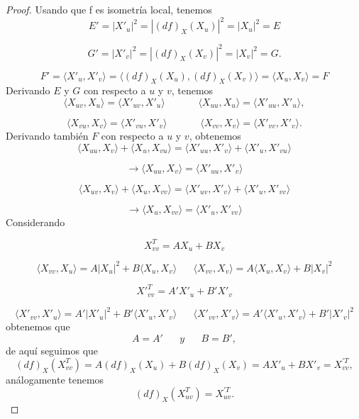 \begin{proof}
	Usando que f es isometría local, tenemos
	${ }$\\
	\[
		E' = |X'_u|^2 = |(df)_X(X_u)|^2 = |X_u|^2 = E
	\]
	
	\[
		G' = |X'_v|^2 = |(df)_X(X_v)|^2 = |X_v|^2 = G.
	\]
	
	\[
		F' = \langle X'_u, X'_v \rangle = \langle (df)_X(X_u), (df)_X(X_v) \rangle = \langle X_u, X_v \rangle = F
	\]
	${ }$\\
	
	Derivando $E$ y $G$ con respecto a $u$ y $v$, tenemos
	${ }$\\
	\[
		\langle X_{uv}, X_u \rangle = \langle X'_{uv}, X'_u \rangle \;\;\;\;\;\;  \;\;\;\;\;\; \langle X_{uu}, X_u \rangle = \langle X'_{uu}, X'_u \rangle,
	\]
	
	\[
		\langle X_{vu}, X_v \rangle = \langle X'_{vu}, X'_v \rangle \;\;\;\;\;\;  \;\;\;\;\;\; \langle X_{vv}, X_v \rangle = \langle X'_{vv}, X'_v \rangle.
	\]
	${ }$\\
	
	Derivando también $F$ con respecto a $u$ y $v$, obtenemos
	${ }$\\
	\[
		\langle X_{uu}, X_v \rangle + \langle X_u, X_{vu} \rangle = \langle X'_{uu}, X'_v \rangle + \langle X'_u, X'_{vu} \rangle
	\]
	
	\[
		\to \langle X_{uu}, X_v \rangle = \langle X'_{uu}, X'_v \rangle
	\]
	
	\[
		\langle X_{uv}, X_v \rangle + \langle X_u, X_{vv} \rangle = \langle X'_{uv}, X'_v \rangle + \langle X'_u, X'_{vv} \rangle
	\]
	
	\[
		\to \langle X_u, X_{vv} \rangle = \langle X'_u, X'_{vv} \rangle
	\]
	${ }$\\
	
	Considerando
	
	\[
		X^{T}_{vv} = AX_u + BX_v
	\]
	
	\[
		\langle X_{vv}, X_u \rangle = A|X_u|^2 + B \langle X_u, X_v \rangle \;\;\;\;\;\; \langle X_{vv}, X_v \rangle = A \langle X_u, X_v \rangle + B|X_v|^2
	\]
	
	\[
		{X'}^{T}_{vv} = A'X'_u + B'X'_v
	\]
	
	\[
		\langle X'_{vv}, X'_u \rangle = A'|X'_u|^2 + B'\langle X'_u, X'_v \rangle \;\;\;\;\;\; \langle X'_{vv}, X'_v \rangle = A' \langle X'_u, X'_v \rangle + B'|X'_v|^2
	\]
	${ }$\\
	obtenemos que
	${ }$\\
	\[
		A = A' \;\;\;\;\;\; y \;\;\;\;\;\; B = B',
	\]
	${ }$\\
	de aquí seguimos que
	${ }$\\
	\[
		(df)_X(X^{T}_{vv}) = A(df)_X(X_u) + B(df)_X(X_v) = AX'_u + BX'_v = X^{'T}_{vv},
	\]
	${ }$\\
	análogamente tenemos
	${ }$\\
	\[
		(df)_X(X^{T}_{uv}) = X^{'T}_{uv}.
	\]
	${ }$\\
	

\end{proof}
